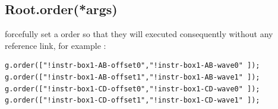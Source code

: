\documentclass{article}
\begin{document}
\subsection{Root.order(*args)}
forcefully set a order so that they 
will executed consequently without any reference link,
for example : 
\begin{lstlisting}
g.order(["!instr-box1-AB-offset0","!instr-box1-AB-wave0" ]);
g.order(["!instr-box1-AB-offset1","!instr-box1-AB-wave1" ]);
g.order(["!instr-box1-CD-offset0","!instr-box1-CD-wave0" ]);
g.order(["!instr-box1-CD-offset1","!instr-box1-CD-wave1" ]);
\end{lstlisting}
\end{document}
